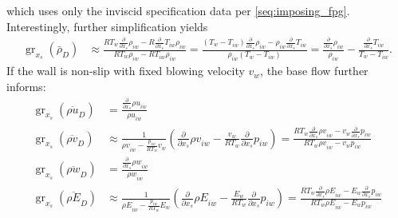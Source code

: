 \documentclass[letterpaper,11pt,nointlimits,reqno,draft]{amsbook}
\begin{document}
which uses only the inviscid specification data per \autoref{seq:imposing_fpg}.
Interestingly, further simplification yields
\begin{align}
    \operatorname{gr}_{x_s}\!\left(\bar{\rho}_{D}\right)
    &\approx
    \frac{
          R T_w \frac{\partial}{\partial x_s}        \rho_{iw}
        - R     \frac{\partial}{\partial x_s} T_{iw} \rho_{iw}
    }{
          R T_w \rho_{iw} - R T_{iw} \rho_{iw}
    }
    =
    \frac{
          \left( T_w - T_{iw} \right) \frac{\partial}{\partial x_s} \rho_{iw}
        - \rho_{iw} \frac{\partial}{\partial x_s} T_{iw}
    }{
          \rho_{iw} \left( T_w - T_{iw} \right)
    }
    = \frac{ \frac{\partial}{\partial x_s} \rho_{iw} } { \rho_{iw} }
    - \frac{\frac{\partial}{\partial x_s} T_{iw} }{T_w - T_{iw}}
    .
\end{align}
%
%
If the wall is non-slip with fixed blowing velocity $v_w$, the base flow further
informs:
\begin{align}
    \operatorname{gr}_{x_s}\!\left(\overline{\rho u}_{D}\right)
    &=
    \frac{
        \frac{\partial}{\partial x_s}          {\rho u}_{iw}
    }{
        {\rho u}_{iw}
    }
    \\
    \operatorname{gr}_{x_s}\!\left(\overline{\rho v}_{D}\right)
    &\approx
    \frac{1}{{\rho v}_{iw} - \frac{p_{iw}}{R T_w} v_w}
    \left(
          \frac{\partial}{\partial x_s}         {\rho v}_{iw}
        - \frac{v_w}{R T_w} \frac{\partial}{\partial x_s} {p}_{iw}
    \right)
    =
    \frac{
          R T_w \frac{\partial}{\partial x_s} {\rho v}_{iw}
        -   v_w \frac{\partial}{\partial x_s} {p     }_{iw}
    }{
        R T_w {\rho v}_{iw} - v_w p_{iw}
    }
    \\
    \operatorname{gr}_{x_s}\!\left(\overline{\rho w}_{D}\right)
    &=
    \frac{
        \frac{\partial}{\partial x_s}          {\rho w}_{iw}
    }{
        {\rho w}_{iw}
    }
    \\
    \operatorname{gr}_{x_s}\!\left(\overline{\rho E}_{D}\right)
    &\approx
    \frac{1}{{\rho E}_{iw} - \frac{p_{iw}}{R T_w} E_w}
    \left(
          \frac{\partial}{\partial x_s}         {\rho E}_{iw}
        - \frac{E_w}{R T_w} \frac{\partial}{\partial x_s} {p}_{iw}
    \right)
    =
    \frac{
          R T_w \frac{\partial}{\partial x_s} {\rho E}_{iw}
        -   E_w \frac{\partial}{\partial x_s} {p     }_{iw}
    }{
        R T_w {\rho E}_{iw} - E_w p_{iw}
    }
\end{align}
\end{document}
